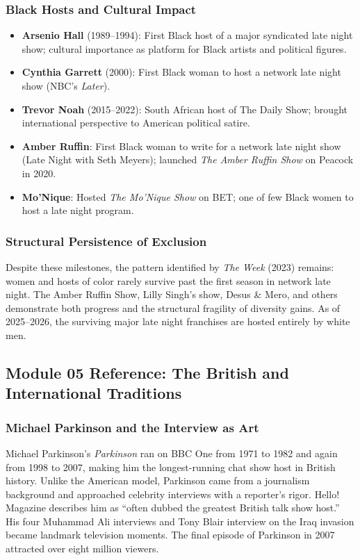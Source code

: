 \documentclass[11pt,letterpaper]{article}
\begin{document}
\subsubsection{Black Hosts and Cultural Impact}
\begin{itemize}[leftmargin=1.5em]
  \item \textbf{Arsenio Hall} (1989--1994): First Black host of a major syndicated late night show; cultural importance as platform for Black artists and political figures.
  \item \textbf{Cynthia Garrett} (2000): First Black woman to host a network late night show (NBC's \textit{Later}).
  \item \textbf{Trevor Noah} (2015--2022): South African host of The Daily Show; brought international perspective to American political satire.
  \item \textbf{Amber Ruffin}: First Black woman to write for a network late night show (Late Night with Seth Meyers); launched \textit{The Amber Ruffin Show} on Peacock in 2020.
  \item \textbf{Mo'Nique}: Hosted \textit{The Mo'Nique Show} on BET; one of few Black women to host a late night program.
\end{itemize}

\subsubsection{Structural Persistence of Exclusion}
Despite these milestones, the pattern identified by \textit{The Week} (2023) remains: women and hosts of color rarely survive past the first season in network late night. The Amber Ruffin Show, Lilly Singh's show, Desus \& Mero, and others demonstrate both progress and the structural fragility of diversity gains. As of 2025--2026, the surviving major late night franchises are hosted entirely by white men.

\subsection{Module 05 Reference: The British and International Traditions}

\subsubsection{Michael Parkinson and the Interview as Art}
Michael Parkinson's \textit{Parkinson} ran on BBC One from 1971 to 1982 and again from 1998 to 2007, making him the longest-running chat show host in British history. Unlike the American model, Parkinson came from a journalism background and approached celebrity interviews with a reporter's rigor. Hello! Magazine describes him as ``often dubbed the greatest British talk show host.'' His four Muhammad Ali interviews and Tony Blair interview on the Iraq invasion became landmark television moments. The final episode of Parkinson in 2007 attracted over eight million viewers.
\end{document}
